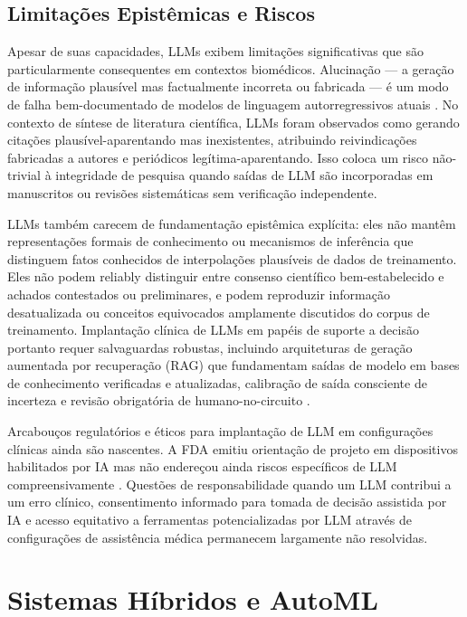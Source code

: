 \subsection{Limitações Epistêmicas e Riscos}

Apesar de suas capacidades, LLMs exibem limitações significativas que são particularmente consequentes em contextos biomédicos. Alucinação --- a geração de informação plausível mas factualmente incorreta ou fabricada --- é um modo de falha bem-documentado de modelos de linguagem autorregressivos atuais \parencite{ji2023}. No contexto de síntese de literatura científica, LLMs foram observados como gerando citações plausível-aparentando mas inexistentes, atribuindo reivindicações fabricadas a autores e periódicos legítima-aparentando. Isso coloca um risco não-trivial à integridade de pesquisa quando saídas de LLM são incorporadas em manuscritos ou revisões sistemáticas sem verificação independente.

LLMs também carecem de fundamentação epistêmica explícita: eles não mantêm representações formais de conhecimento ou mecanismos de inferência que distinguem fatos conhecidos de interpolações plausíveis de dados de treinamento. Eles não podem reliably distinguir entre consenso científico bem-estabelecido e achados contestados ou preliminares, e podem reproduzir informação desatualizada ou conceitos equivocados amplamente discutidos do corpus de treinamento. Implantação clínica de LLMs em papéis de suporte a decisão portanto requer salvaguardas robustas, incluindo arquiteturas de geração aumentada por recuperação (RAG) que fundamentam saídas de modelo em bases de conhecimento verificadas e atualizadas, calibração de saída consciente de incerteza e revisão obrigatória de humano-no-circuito \parencite{lewis2020}.

Arcabouços regulatórios e éticos para implantação de LLM em configurações clínicas ainda são nascentes. A FDA emitiu orientação de projeto em dispositivos habilitados por IA mas não endereçou ainda riscos específicos de LLM compreensivamente \parencite{fda2023}. Questões de responsabilidade quando um LLM contribui a um erro clínico, consentimento informado para tomada de decisão assistida por IA e acesso equitativo a ferramentas potencializadas por LLM através de configurações de assistência médica permanecem largamente não resolvidas.

\section{Sistemas Híbridos e AutoML}

